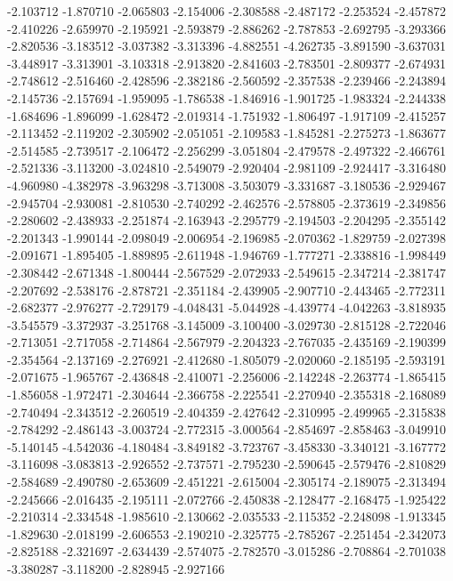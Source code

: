 -2.103712
-1.870710
-2.065803
-2.154006
-2.308588
-2.487172
-2.253524
-2.457872
-2.410226
-2.659970
-2.195921
-2.593879
-2.886262
-2.787853
-2.692795
-3.293366
-2.820536
-3.183512
-3.037382
-3.313396
-4.882551
-4.262735
-3.891590
-3.637031
-3.448917
-3.313901
-3.103318
-2.913820
-2.841603
-2.783501
-2.809377
-2.674931
-2.748612
-2.516460
-2.428596
-2.382186
-2.560592
-2.357538
-2.239466
-2.243894
-2.145736
-2.157694
-1.959095
-1.786538
-1.846916
-1.901725
-1.983324
-2.244338
-1.684696
-1.896099
-1.628472
-2.019314
-1.751932
-1.806497
-1.917109
-2.415257
-2.113452
-2.119202
-2.305902
-2.051051
-2.109583
-1.845281
-2.275273
-1.863677
-2.514585
-2.739517
-2.106472
-2.256299
-3.051804
-2.479578
-2.497322
-2.466761
-2.521336
-3.113200
-3.024810
-2.549079
-2.920404
-2.981109
-2.924417
-3.316480
-4.960980
-4.382978
-3.963298
-3.713008
-3.503079
-3.331687
-3.180536
-2.929467
-2.945704
-2.930081
-2.810530
-2.740292
-2.462576
-2.578805
-2.373619
-2.349856
-2.280602
-2.438933
-2.251874
-2.163943
-2.295779
-2.194503
-2.204295
-2.355142
-2.201343
-1.990144
-2.098049
-2.006954
-2.196985
-2.070362
-1.829759
-2.027398
-2.091671
-1.895405
-1.889895
-2.611948
-1.946769
-1.777271
-2.338816
-1.998449
-2.308442
-2.671348
-1.800444
-2.567529
-2.072933
-2.549615
-2.347214
-2.381747
-2.207692
-2.538176
-2.878721
-2.351184
-2.439905
-2.907710
-2.443465
-2.772311
-2.682377
-2.976277
-2.729179
-4.048431
-5.044928
-4.439774
-4.042263
-3.818935
-3.545579
-3.372937
-3.251768
-3.145009
-3.100400
-3.029730
-2.815128
-2.722046
-2.713051
-2.717058
-2.714864
-2.567979
-2.204323
-2.767035
-2.435169
-2.190399
-2.354564
-2.137169
-2.276921
-2.412680
-1.805079
-2.020060
-2.185195
-2.593191
-2.071675
-1.965767
-2.436848
-2.410071
-2.256006
-2.142248
-2.263774
-1.865415
-1.856058
-1.972471
-2.304644
-2.366758
-2.225541
-2.270940
-2.355318
-2.168089
-2.740494
-2.343512
-2.260519
-2.404359
-2.427642
-2.310995
-2.499965
-2.315838
-2.784292
-2.486143
-3.003724
-2.772315
-3.000564
-2.854697
-2.858463
-3.049910
-5.140145
-4.542036
-4.180484
-3.849182
-3.723767
-3.458330
-3.340121
-3.167772
-3.116098
-3.083813
-2.926552
-2.737571
-2.795230
-2.590645
-2.579476
-2.810829
-2.584689
-2.490780
-2.653609
-2.451221
-2.615004
-2.305174
-2.189075
-2.313494
-2.245666
-2.016435
-2.195111
-2.072766
-2.450838
-2.128477
-2.168475
-1.925422
-2.210314
-2.334548
-1.985610
-2.130662
-2.035533
-2.115352
-2.248098
-1.913345
-1.829630
-2.018199
-2.606553
-2.190210
-2.325775
-2.785267
-2.251454
-2.342073
-2.825188
-2.321697
-2.634439
-2.574075
-2.782570
-3.015286
-2.708864
-2.701038
-3.380287
-3.118200
-2.828945
-2.927166

